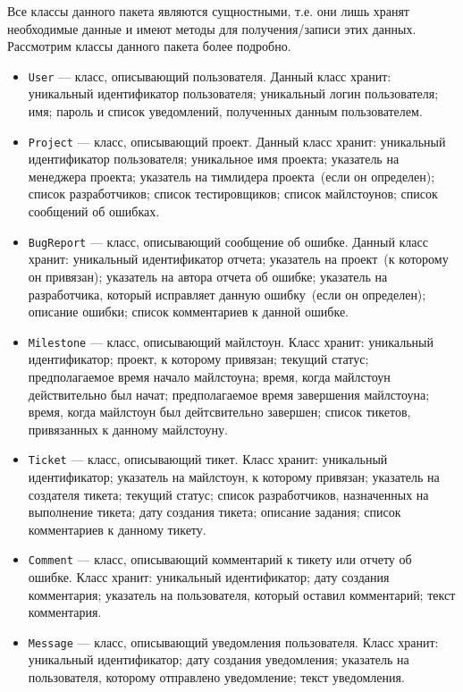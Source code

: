 	Все классы данного пакета являются сущностными, т.е. они лишь хранят необходимые данные и имеют методы для получения/записи этих данных. Рассмотрим классы данного пакета более подробно.
	\begin{itemize}
		\item \texttt{User} --- класс, описывающий пользователя. Данный класс хранит: уникальный идентификатор пользователя; уникальный логин пользователя; имя; пароль и список уведомлений, полученных данным пользователем.
		
		\item \texttt{Project} --- класс, описывающий проект. Данный класс хранит: уникальный идентификатор пользователя; уникальное имя проекта; указатель на менеджера проекта; указатель на тимлидера проекта~(если он определен); список разработчиков; список тестировщиков; список майлстоунов; список сообщений об ошибках.
		
		\item \texttt{BugReport} --- класс, описывающий сообщение об ошибке. Данный класс хранит: уникальный идентификатор отчета; указатель на проект~(к которому он привязан); указатель на автора отчета об ошибке; указатель на разработчика, который исправляет данную ошибку~(если он определен); описание ошибки; список комментариев к данной ошибке.
		
		\item \texttt{Milestone} --- класс, описывающий майлстоун. Класс хранит: уникальный идентификатор; проект, к которому привязан; текущий статус; предполагаемое время начало майлстоуна; время, когда майлстоун действительно был начат; предполагаемое время завершения майлстоуна; время, когда майлстоун был дейтсвительно завершен; список тикетов, привязанных к данному майлстоуну.
		
		\item \texttt{Ticket} --- класс, описывающий тикет. Класс хранит: уникальный идентификатор; указатель на майлстоун, к которому привязан; указатель на создателя тикета; текущий статус; список разработчиков, назначенных на выполнение тикета; дату создания тикета; описание задания; список комментариев к данному тикету.
		
		\item \texttt{Comment} --- класс, описывающий комментарий к тикету или отчету об ошибке. Класс хранит: уникальный идентификатор; дату создания комментария; указатель на пользователя, который оставил комментарий; текст комментария.
		
		\item \texttt{Message} --- класс, описывающий уведомления пользователя. Класс хранит: уникальный идентификатор; дату создания уведомления; указатель на пользователя, которому отправлено уведомление; текст уведомления.
	\end{itemize}
	
